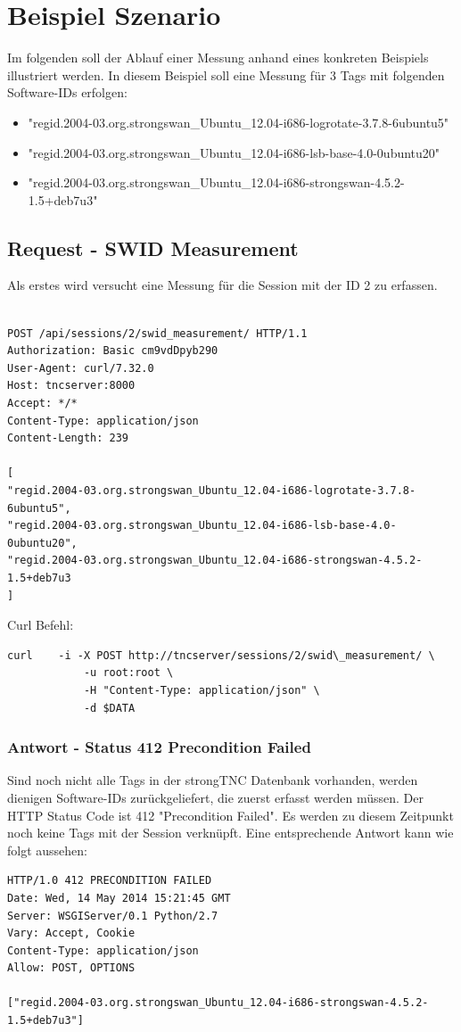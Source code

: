 \documentclass[10pt,a4paper]{scrartcl}
\begin{document}
\section{Beispiel Szenario}
Im folgenden soll der Ablauf einer Messung anhand eines konkreten Beispiels illustriert werden. In diesem Beispiel soll eine Messung für 3 Tags mit folgenden Software-IDs erfolgen:
\begin{itemize}
\item "regid.2004-03.org.strongswan\_Ubuntu\_12.04-i686-logrotate-3.7.8-6ubuntu5"
\item "regid.2004-03.org.strongswan\_Ubuntu\_12.04-i686-lsb-base-4.0-0ubuntu20"
\item "regid.2004-03.org.strongswan\_Ubuntu\_12.04-i686-strongswan-4.5.2-1.5+deb7u3"
\end{itemize}

\subsection{Request - SWID Measurement}
Als erstes wird versucht eine Messung für die Session mit der ID 2 zu erfassen. \hfill
\begin{lstlisting}

POST /api/sessions/2/swid_measurement/ HTTP/1.1
Authorization: Basic cm9vdDpyb290
User-Agent: curl/7.32.0
Host: tncserver:8000
Accept: */*
Content-Type: application/json
Content-Length: 239

[
"regid.2004-03.org.strongswan_Ubuntu_12.04-i686-logrotate-3.7.8-6ubuntu5",
"regid.2004-03.org.strongswan_Ubuntu_12.04-i686-lsb-base-4.0-0ubuntu20",
"regid.2004-03.org.strongswan_Ubuntu_12.04-i686-strongswan-4.5.2-1.5+deb7u3
]

\end{lstlisting}

Curl Befehl:
\begin{lstlisting}
curl	-i -X POST http://tncserver/sessions/2/swid\_measurement/ \
			-u root:root \
			-H "Content-Type: application/json" \
			-d $DATA
\end{lstlisting}
\subsubsection{Antwort - Status 412 Precondition Failed}
Sind noch nicht alle Tags in der strongTNC Datenbank vorhanden, werden dienigen Software-IDs zurückgeliefert, die zuerst erfasst werden müssen. Der HTTP Status Code ist 412 "Precondition Failed". Es werden zu diesem Zeitpunkt noch keine Tags mit der Session verknüpft. Eine entsprechende Antwort kann wie folgt aussehen:
\begin{lstlisting}
HTTP/1.0 412 PRECONDITION FAILED
Date: Wed, 14 May 2014 15:21:45 GMT
Server: WSGIServer/0.1 Python/2.7
Vary: Accept, Cookie
Content-Type: application/json
Allow: POST, OPTIONS

["regid.2004-03.org.strongswan_Ubuntu_12.04-i686-strongswan-4.5.2-1.5+deb7u3"]
\end{lstlisting}
\end{document}
